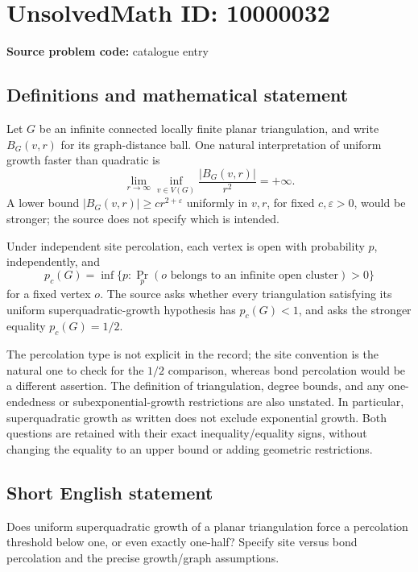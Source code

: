 \documentclass[11pt]{article}
\begin{document}
\section*{UnsolvedMath ID: 10000032}
\textbf{Source problem code:} catalogue entry
\subsection{Definitions and mathematical statement}
Let $G$ be an infinite connected locally finite planar triangulation, and write $B_G(v,r)$ for its graph-distance ball. One natural interpretation of uniform growth faster than quadratic is
\[
\lim_{r\to\infty}\inf_{v\in V(G)}\frac{|B_G(v,r)|}{r^2}=+\infty.
\]
A lower bound $|B_G(v,r)|\geq c r^{2+\varepsilon}$ uniformly in $v,r$, for fixed $c,\varepsilon>0$, would be stronger; the source does not specify which is intended.

Under independent site percolation, each vertex is open with probability $p$, independently, and
\[
p_c(G)=\inf\{p:\Pr_p(o\text{ belongs to an infinite open cluster})>0\}
\]
for a fixed vertex $o$. The source asks whether every triangulation satisfying its uniform superquadratic-growth hypothesis has $p_c(G)<1$, and asks the stronger equality $p_c(G)=1/2$.

The percolation type is not explicit in the record; the site convention is the natural one to check for the $1/2$ comparison, whereas bond percolation would be a different assertion. The definition of triangulation, degree bounds, and any one-endedness or subexponential-growth restrictions are also unstated. In particular, superquadratic growth as written does not exclude exponential growth. Both questions are retained with their exact inequality/equality signs, without changing the equality to an upper bound or adding geometric restrictions.
\subsection{Short English statement}
Does uniform superquadratic growth of a planar triangulation force a percolation threshold below one, or even exactly one-half? Specify site versus bond percolation and the precise growth/graph assumptions.
\end{document}
